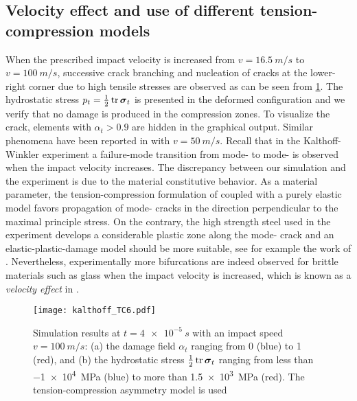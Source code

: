 \subsection{Velocity effect and use of different tension-compression models}
When the prescribed impact velocity is increased from $v=\SI{16.5}{m/s}$ to $v=\SI{100}{m/s}$, successive crack branching and nucleation of cracks at the lower-right corner due to high tensile stresses are observed as can be seen from \cref{fig:v1d5}. The hydrostatic stress $p_t=\frac{1}{2}\tr\sig_t$ is presented in the deformed configuration and we verify that no damage is produced in the compression zones. To visualize the crack, elements with $\alpha_t>0.9$ are hidden in the graphical output. Similar phenomena have been reported in \cite{HofackerMiehe:2012} with $v=\SI{50}{m/s}$. Recall that in the Kalthoff-Winkler experiment a failure-mode transition from mode- to mode- is observed when the impact velocity increases. The discrepancy between our simulation and the experiment is due to the material constitutive behavior. As a material parameter, the tension-compression formulation of \cite{FreddiRoyer-Carfagni:2010} coupled with a purely elastic model favors propagation of mode- cracks in the direction perpendicular to the maximal principle stress. On the contrary, the high strength steel used in the experiment develops a considerable plastic zone along the mode- crack and an elastic-plastic-damage model should be more suitable, see for example the work of \cite{MieheHofackerSchaenzelAldakheel:2015}. Nevertheless, experimentally more bifurcations are indeed observed for brittle materials such as glass when the impact velocity is increased, which is known as a \emph{velocity effect} in \cite{Schardin:2012}.
\begin{figure}[htbp]
\centering
\texttt{[image: kalthoff\_TC6.pdf]}
\caption{Simulation results at $t=\SI{4e-5}{s}$ with an impact speed $v=\SI{100}{m/s}$: (a) the damage field $\alpha_t$ ranging from 0 (blue) to 1 (red), and (b) the hydrostatic stress $\frac{1}{2}\tr\sig_t$ ranging from less than \SI{-1e4}{MPa} (blue) to more than \SI{1.5e3}{MPa} (red). The tension-compression asymmetry model \cite{FreddiRoyer-Carfagni:2010} is used} \label{fig:v1d5}
\end{figure}

